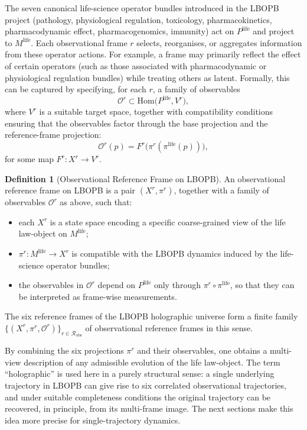\documentclass[11pt]{book}
\theoremstyle{plain}
\theoremstyle{definition}
\newtheorem{definition}[theorem]{Definition}
\theoremstyle{remark}
\begin{document}
The seven canonical life-science operator bundles introduced in the
LBOPB project (pathology, physiological regulation, toxicology,
pharmacokinetics, pharmacodynamic effect, pharmacogenomics, immunity)
act on $P^{\mathrm{life}}$ and project to $M^{\mathrm{life}}$. Each
observational frame $r$ selects, reorganises, or aggregates information
from these operator actions. For example, a frame may primarily reflect
the effect of certain operators (such as those associated with
pharmacodynamic or physiological regulation bundles) while treating
others as latent. Formally, this can be captured by specifying, for
each $r$, a family of observables
\[
  \mathcal{O}^{r} \subset \mathrm{Hom}\bigl(P^{\mathrm{life}}, V^{r}\bigr),
\]
where $V^{r}$ is a suitable target space, together with compatibility
conditions ensuring that the observables factor through the base
projection and the reference-frame projection:
\[
  \mathcal{O}^{r}(p) = F^{r}\bigl(\pi^{r}(\pi^{\mathrm{life}}(p))\bigr),
\]
for some map $F^{r} \colon X^{r} \to V^{r}$.

\begin{definition}[Observational Reference Frame on LBOPB]
An observational reference frame on LBOPB is a pair
$(X^{r}, \pi^{r})$, together with a family of observables
$\mathcal{O}^{r}$ as above, such that:
\begin{itemize}
  \item each $X^{r}$ is a state space encoding a specific coarse-grained
        view of the life law-object on $M^{\mathrm{life}}$;
  \item $\pi^{r} \colon M^{\mathrm{life}} \to X^{r}$ is compatible with
        the LBOPB dynamics induced by the life-science operator bundles;
  \item the observables in $\mathcal{O}^{r}$ depend on $P^{\mathrm{life}}$
        only through $\pi^{r} \circ \pi^{\mathrm{life}}$, so that they
        can be interpreted as frame-wise measurements.
\end{itemize}
The six reference frames of the LBOPB holographic universe form a
finite family\\
$\{(X^{r}, \pi^{r}, \mathcal{O}^{r})\}_{r \in \mathcal{R}_{\mathrm{obs}}}$
of observational reference frames in this sense.
\end{definition}

By combining the six projections $\pi^{r}$ and their observables,
one obtains a multi-view description of any admissible evolution of
the life law-object. The term ``holographic'' is used here in a purely
structural sense: a single underlying trajectory in LBOPB can give rise
to six correlated observational trajectories, and under suitable
completeness conditions the original trajectory can be recovered, in
principle, from its multi-frame image. The next sections make this idea
more precise for single-trajectory dynamics.
\end{document}
